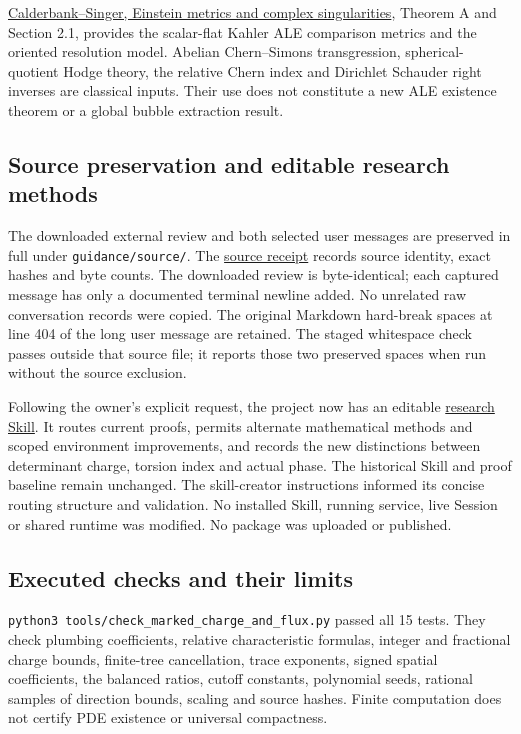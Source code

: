 \documentclass[
  10pt,
]{article}
\begin{document}
\href{https://arxiv.org/html/math/0206229}{Calderbank--Singer, Einstein
metrics and complex singularities}, Theorem A and Section 2.1, provides
the scalar-flat Kahler ALE comparison metrics and the oriented
resolution model. Abelian Chern--Simons transgression,
spherical-quotient Hodge theory, the relative Chern index and Dirichlet
Schauder right inverses are classical inputs. Their use does not
constitute a new ALE existence theorem or a global bubble extraction
result.

\hypertarget{source-preservation-and-editable-research-methods}{%
\subsection{Source preservation and editable research
methods}\label{source-preservation-and-editable-research-methods}}

The downloaded external review and both selected user messages are
preserved in full under \nolinkurl{guidance/source/}. The
\href{../guidance/source/20260927_review_guidance_receipt.json}{source
receipt} records source identity, exact hashes and byte counts. The
downloaded review is byte-identical; each captured message has only a
documented terminal newline added. No unrelated raw conversation records
were copied. The original Markdown hard-break spaces at line 404 of the
long user message are retained. The staged whitespace check passes
outside that source file; it reports those two preserved spaces when run
without the source exclusion.

Following the owner's explicit request, the project now has an editable
\href{../skills/line1-research/SKILL.md}{research Skill}. It routes
current proofs, permits alternate mathematical methods and scoped
environment improvements, and records the new distinctions between
determinant charge, torsion index and actual phase. The historical Skill
and proof baseline remain unchanged. The skill-creator instructions
informed its concise routing structure and validation. No installed
Skill, running service, live Session or shared runtime was modified. No
package was uploaded or published.

\hypertarget{executed-checks-and-their-limits}{%
\subsection{Executed checks and their
limits}\label{executed-checks-and-their-limits}}

\texttt{python3\ tools/\nolinkurl{check_marked_charge_and_flux.py}} passed all
15 tests. They check plumbing coefficients, relative characteristic
formulas, integer and fractional charge bounds, finite-tree
cancellation, trace exponents, signed spatial coefficients, the balanced
ratios, cutoff constants, polynomial seeds, rational samples of
direction bounds, scaling and source hashes. Finite computation does not
certify PDE existence or universal compactness.
\end{document}
